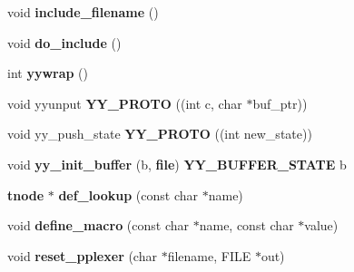 \begin{CompactItemize}
\item 
void {\bf include\_\-filename} ()
\item 
void {\bf do\_\-include} ()
\item 
int {\bf yywrap} ()
\item 
void yyunput {\bf YY\_\-PROTO} ((int c, char $\ast$buf\_\-ptr))
\item 
void yy\_\-push\_\-state {\bf YY\_\-PROTO} ((int new\_\-state))
\item 
void {\bf yy\_\-init\_\-buffer} (b, {\bf file}) {\bf YY\_\-BUFFER\_\-STATE} b
\item 
{\bf tnode} $\ast$ {\bf def\_\-lookup} (const char $\ast$name)
\item 
void {\bf define\_\-macro} (const char $\ast$name, const char $\ast$value)
\item 
void {\bf reset\_\-pplexer} (char $\ast$filename, FILE $\ast$out)
\end{CompactItemize}

